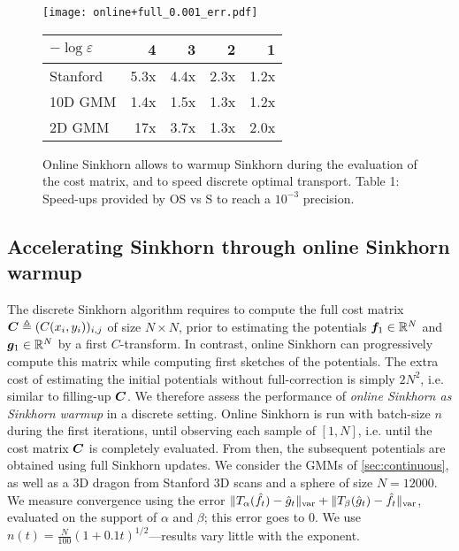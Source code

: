\begin{figure}[t]
    \begin{minipage}{.7\textwidth}
    \texttt{[image: online+full\_0.001\_err.pdf]}
    \end{minipage}%
    \hfill
    \begin{minipage}{.3\textwidth}
        \centering
        \scriptsize
        \begin{tabular}{lrrrr}
            \toprule
            $- \log \varepsilon$
            &  4 & 3 & 2 & 1 \\
            \midrule
            Stanford      &     5.3x &    4.4x &    2.3x &    1.2x \\
            10D GMM     &     1.4x &    1.5x &    1.3x &    1.2x \\
            2D GMM      &    17x &    3.7x &    1.3x &    2.0x \\
            \bottomrule
            \end{tabular}
    \end{minipage}
    \caption{Online Sinkhorn allows to warmup Sinkhorn during the evaluation of the cost matrix, and to speed discrete optimal transport. Table 1: Speed-ups provided by OS vs S to reach a $10^{-3}$ precision.}
    \label{fig:warmup}
    \vspace{-.8em}
\end{figure}


\subsection{Accelerating Sinkhorn through online Sinkhorn warmup}\label{sec:accelerating}

The discrete Sinkhorn algorithm requires to compute the full cost matrix $\bm{C}
\triangleq (C(x_i,y_i))_{i,j}$  of size $N \times N$, prior to estimating the
potentials $\bm{f}_1 \in \mathbb{R}^N$ and $\bm{g}_1 \in \mathbb{R}^N$ by a first $C$-transform. In
contrast, online Sinkhorn can progressively compute this matrix while computing
first sketches of the potentials. The extra cost of estimating the initial
potentials without full-correction is simply $2 N^2$, i.e. similar to filling-up
$\bm{C}$. We therefore assess the performance of \textit{online Sinkhorn as
Sinkhorn warmup} in a discrete setting. Online Sinkhorn is run with batch-size
$n$ during the first iterations, until observing each sample of $[1,N]$, i.e.
until the cost matrix $\bm{C}$ is completely evaluated. From then, the subsequent
potentials are obtained using full Sinkhorn updates. We consider the GMMs of
\autoref{sec:continuous}, as well as a 3D dragon from Stanford 3D scans
\cite{turk1994zippered} and a sphere of size $N=12000$. We measure convergence
using the error $\Vert T_{\alpha}(\hat f_t) - \hat g_t
\Vert_{\text{\upshape var}} + \Vert T_{\beta}(\hat g_t) - \hat f_t \Vert_{\text{\upshape var}}$,
evaluated on the support of $\alpha$ and $\beta$; this error goes to $0$. We use
$n(t) = \frac{N}{100} (1+0.1t)^{1/2}$---results vary little with the exponent.


